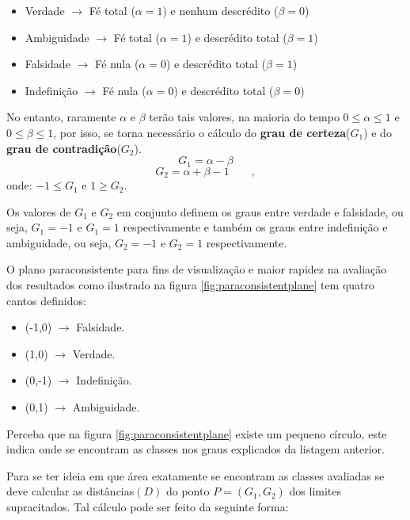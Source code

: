 				\begin{itemize}
					\item Verdade $\rightarrow$ Fé total ($\alpha = 1$) e nenhum descrédito ($\beta = 0$)
					\item Ambiguidade $\rightarrow$ Fé total ($\alpha = 1$) e descrédito total ($\beta = 1$)
					\item Falsidade $\rightarrow$ Fé nula ($\alpha = 0$) e descrédito total ($\beta = 1$)
					\item Indefinição $\rightarrow$ Fé nula ($\alpha = 0$) e descrédito total ($\beta = 0$)
				\end{itemize}
				
				\par No entanto, raramente $\alpha$ e $\beta$ terão tais valores, na maioria do tempo $0 \leqslant \alpha \leqslant 1$ e $0 \leqslant \beta \leqslant 1$, por isso, se torna necessário o cálculo do \textbf{grau de certeza}($G_1$) e do \textbf{grau de contradição}($G_2$).
				\begin{equation}
					G_1=\alpha-\beta 
				\end{equation}
				\begin{equation}
					G_2=\alpha+\beta-1 \qquad,
				\end{equation}
			onde: $-1 \leqslant G_1$ e  $1 \geqslant G_2$.

			\par Os valores de $G_1$ e $G_2$ em conjunto definem os graus entre verdade e falsidade, ou seja, $G_1=-1$ e $G_1=1$ respectivamente e também os graus entre indefinição e ambiguidade, ou seja, $G_2=-1$ e $G_2=1$ respectivamente.
			\par O plano paraconsistente para fins de visualização e maior rapidez na avaliação dos resultados como ilustrado na figura \ref{fig:paraconsistentplane} tem quatro cantos definidos:
			\begin{itemize}
				\item (-1,0) $\rightarrow$ Falsidade.
				\item (1,0) $\rightarrow$ Verdade.
				\item (0,-1) $\rightarrow$ Indefinição.
				\item (0,1) $\rightarrow$ Ambiguidade.
			\end{itemize}
			\par Perceba que na figura \ref{fig:paraconsistentplane} existe um pequeno círculo, este indica onde se encontram as classes nos graus explicados da listagem anterior.
			\par Para se ter ideia em que área exatamente se encontram as classes avaliadas se deve calcular as distâncias$(D)$ do ponto $P=(G_1,G_2)$ dos limites supracitados. Tal cálculo pode ser feito da seguinte forma:

